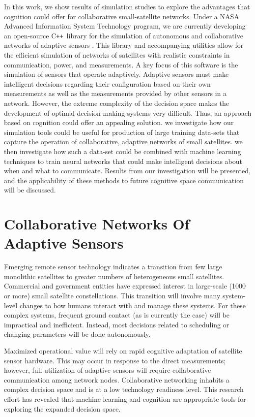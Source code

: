 \documentclass[conference]{IEEEtran}
\newcommand{\cpp}{C\texttt{++}~}
\begin{document}
In this work, we show results of simulation studies to explore the advantages that cognition could offer for collaborative small-satellite networks.  Under a NASA Advanced Information System Technology program, we are currently developing an open-source \cpp library for the simulation of autonomous and collaborative networks of adaptive sensors \cite{ref6}.  This library and accompanying utilities allow for the efficient simulation of networks of satellites with realistic constraints in communication, power, and measurements.  A key focus of this software is the simulation of sensors that operate adaptively.  Adaptive sensors must make intelligent decisions regarding their configuration based on their own measurements as well as the measurements provided by other sensors in a network.  However, the extreme complexity of the decision space makes the development of optimal decision-making systems very difficult.  Thus, an approach based on cognition could offer an appealing solution.  we investigate how our simulation tools could be useful for production of large training data-sets that capture the operation of collaborative, adaptive networks of small satellites.  we then investigate how such a data-set could be combined with machine learning techniques to train neural networks that could make intelligent decisions about when and what to communicate.  Results from our investigation will be presented, and the applicability of these methods to future cognitive space communication will be discussed.


\section{Collaborative Networks Of Adaptive Sensors}
\label{sec:overview}

Emerging remote sensor technology indicates a transition from few large monolithic satellites to greater numbers of heterogeneous small satellites.  Commercial and government entities have expressed interest in large-scale (1000 or more) small satellite constellations.  This transition will involve many system-level changes to how humans interact with and manage these systems.  For these complex systems, frequent ground contact (as is currently the case) will be impractical and inefficient.  Instead, most decisions related to scheduling or changing parameters will be done autonomously.

Maximized operational value will rely on rapid cognitive adaptation of satellite sensor hardware.  This may occur in response to the direct measurements; however, full utilization of adaptive sensors will require collaborative communication among network nodes.  Collaborative networking inhabits a complex decision space and is at a low technology readiness level.  This research effort has revealed that machine learning and cognition are appropriate tools for exploring the expanded decision space.
\end{document}
